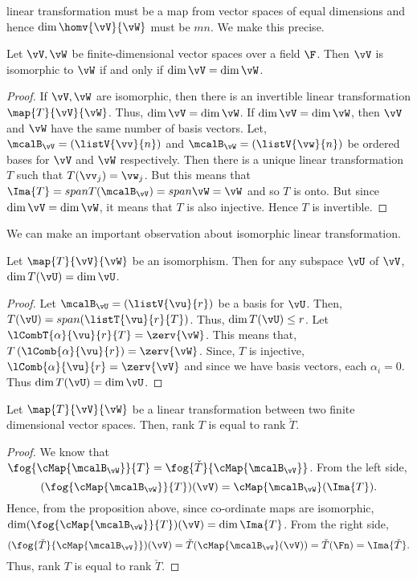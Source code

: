 linear transformation must be a map from vector spaces of equal dimensions and hence $\dim{\homv{\vV}{\vW}}$
must be $mn$. We make this precise.
\begin{Proposition}
    Let $\vV,\vW$ be finite-dimensional vector spaces over a field $\F$. Then $\vV$ is isomorphic to $\vW$ if
    and only if $\dim{\vV} = \dim{\vW}$.
\end{Proposition}
\begin{proof}
    If $\vV,\vW$ are isomorphic, then there is an invertible linear transformation $\map{T}{\vV}{\vW}$. Thus,
    $\dim{\vV} = \dim{\vW}$.
    If $\dim{\vV} = \dim{\vW}$, then $\vV$ and $\vW$ have the same number of basis vectors. Let,
    $\mcalB_{\vV} = \left(\listV{\vv}{n}\right)$ and 
    $\mcalB_{\vW} = \left(\listV{\vw}{n}\right)$ be ordered bases for $\vV$ and $\vW$ respectively. Then there
    is a unique linear transformation $T$ such that $T(\vv_{j}) = \vw_{j}$. But this means that
    $\Ima{T} = span{T(\mcalB_{\vV})} = span{\vW} = \vW$ and so $T$ is onto. But since $\dim{\vV} = \dim{\vW}$, it
    means that $T$ is also injective. Hence $T$ is invertible.
\end{proof}
We can make an important observation about isomorphic linear transformation.
\begin{Proposition}
    Let $\map{T}{\vV}{\vW}$ be an isomorphism. Then for any subspace $\vU$ of $\vV$,
    $\dim{T(\vU)} = \dim{\vU}$.
\end{Proposition}
\begin{proof}
    Let $\mcalB_{\vU} = \left(\listV{\vu}{r}\right)$ be a basis for $\vU$. Then,
    $T(\vU) = span{\left(\listT{\vu}{r}{T}\right)}$. Thus, $\dim{T(\vU)} \leq r$. 
    Let $\lCombT{\alpha}{\vu}{r}{T} = \zerv{\vW}$. This means that,
    $T\left(\lComb{\alpha}{\vu}{r}\right) = \zerv{\vW}$. Since, $T$ is injective,
    $\lComb{\alpha}{\vu}{r} = \zerv{\vV}$ and since we have basis vectors, each $\alpha_{i} = 0$.
    Thus $\dim{T(\vU)} = \dim{\vU}$.
\end{proof}
\begin{Proposition}
    Let $\map{T}{\vV}{\vW}$ be a linear transformation between two finite dimensional vector spaces. Then,
    rank $T$ is equal to rank $\check{T}$.
\end{Proposition}
\begin{proof}
    We know that $\fog{\cMap{\mcalB_{\vW}}}{T} = \fog{\check{T}}{\cMap{\mcalB_{\vV}}}$.
    From the left side,
    \[(\fog{\cMap{\mcalB_{\vW}}}{T})(\vV) = \cMap{\mcalB_{\vW}}(\Ima{T}).\]
    Hence, from the proposition above, since co-ordinate maps are isomorphic,
    $\dim(\fog{\cMap{\mcalB_{\vW}}}{T})(\vV) = \dim{\Ima{T}}$.
    From the right side, 
    \[(\fog{\check{T}}{\cMap{\mcalB_{\vV}}})(\vV) = \check{T}(\cMap{\mcalB_{\vV}}(\vV))
	= \check{T}(\Fn) = \Ima{\check{T}}.\]
    Thus, rank $T$ is equal to rank $\check{T}$.
\end{proof}


